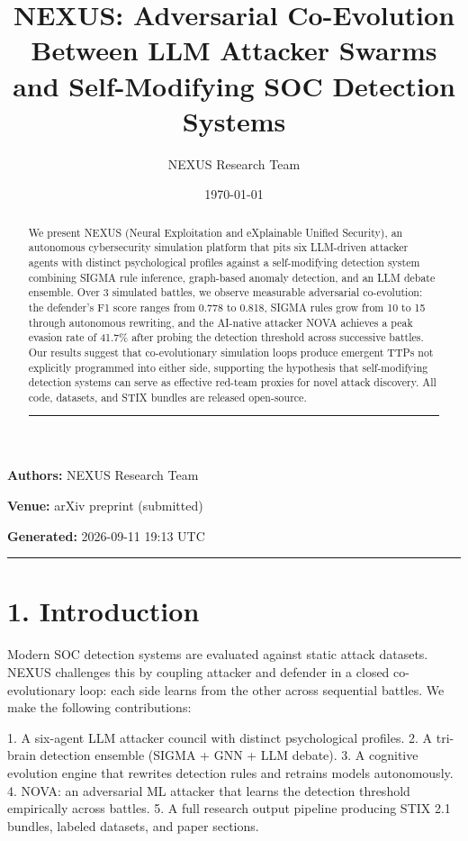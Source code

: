 \documentclass{article}
\title{NEXUS: Adversarial Co-Evolution Between LLM Attacker Swarms and Self-Modifying SOC Detection Systems}
\author{NEXUS Research Team}
\date{\today}
\begin{document}
\maketitle


\textbf{Authors:} NEXUS Research Team  

\textbf{Venue:} arXiv preprint (submitted)  

\textbf{Generated:} 2026-09-11 19:13 UTC  

\hrule\vspace{6pt}

\begin{abstract}

We present NEXUS (Neural Exploitation and eXplainable Unified Security), an autonomous cybersecurity simulation platform that pits six LLM-driven attacker agents with distinct psychological profiles against a self-modifying detection system combining SIGMA rule inference, graph-based anomaly detection, and an LLM debate ensemble. Over 3 simulated battles, we observe measurable adversarial co-evolution: the defender's F1 score ranges from 0.778 to 0.818, SIGMA rules grow from 10 to 15 through autonomous rewriting, and the AI-native attacker NOVA achieves a peak evasion rate of 41.7\% after probing the detection threshold across successive battles. Our results suggest that co-evolutionary simulation loops produce emergent TTPs not explicitly programmed into either side, supporting the hypothesis that self-modifying detection systems can serve as effective red-team proxies for novel attack discovery. All code, datasets, and STIX bundles are released open-source.


\hrule\vspace{6pt}

\end{abstract}

\section{1. Introduction}

Modern SOC detection systems are evaluated against static attack datasets. NEXUS challenges this by coupling attacker and defender in a closed co-evolutionary loop: each side learns from the other across sequential battles. We make the following contributions:

1. A six-agent LLM attacker council with distinct psychological profiles.
2. A tri-brain detection ensemble (SIGMA + GNN + LLM debate).
3. A cognitive evolution engine that rewrites detection rules and retrains models autonomously.
4. NOVA: an adversarial ML attacker that learns the detection threshold empirically across battles.
5. A full research output pipeline producing STIX 2.1 bundles, labeled datasets, and paper sections.
\end{document}
